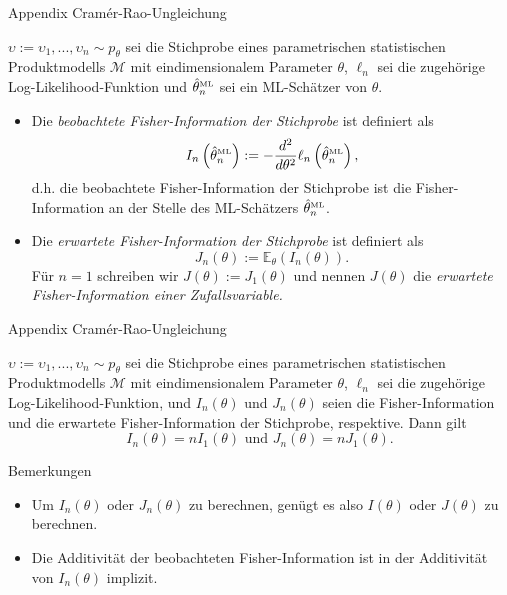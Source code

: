 \documentclass[
  8pt,
  ignorenonframetext,
]{beamer}
\providecommand{\tightlist}{%
  \setlength{\itemsep}{0pt}\setlength{\parskip}{0pt}}
\newcommand{\ups} {\upsilon}
\begin{document}
\begin{frame}{Appendix \textbar{} Cramér-Rao-Ungleichung}
\protect\hypertarget{appendix-cramuxe9r-rao-ungleichung-2}{}
\small
\begin{definition}
\justifying
$\ups := \ups_1,...,\ups_n \sim p_\theta$ sei die Stichprobe eines parametrischen statistischen
Produktmodells $\mathcal{M}$ mit eindimensionalem Parameter $\theta$, $\ell_n$
sei die zugehörige Log-Likelihood-Funktion und $\hat{\theta}_n^{\mbox{\tiny ML}}$
sei ein ML-Schätzer von $\theta$.
\begin{itemize}
\justifying
\item Die \textit{beobachtete Fisher-Information der Stichprobe} ist
definiert als
\begin{equation}
I_n\left(\hat{\theta}^{\mbox{\tiny ML}}_n\right)
:= -\frac{d^2}{d\theta^2}\ell_n\left(\hat{\theta}^{\mbox{\tiny ML}}_n\right),
\end{equation}
d.h. die beobachtete Fisher-Information der Stichprobe ist die
Fisher-Information an der Stelle des ML-Schätzers $\hat{\theta}^{\mbox{\tiny ML}}_n$.
\item Die \textit{erwartete Fisher-Information der Stichprobe} ist
definiert als
\begin{equation}
J_n(\theta) := \mathbb{E}_\theta(I_n(\theta)).
\end{equation}
Für $n = 1$ schreiben wir $J(\theta) := J_1(\theta)$ und nennen $J(\theta)$ die
\textit{erwartete Fisher-Information einer Zufallsvariable.}
\end{itemize}
\end{definition}
\end{frame}

\begin{frame}{Appendix \textbar{} Cramér-Rao-Ungleichung}
\protect\hypertarget{appendix-cramuxe9r-rao-ungleichung-3}{}
\small
\begin{theorem}
\normalfont
\justifying
$\ups := \ups_1,...,\ups_n \sim p_\theta$ sei die Stichprobe eines parametrischen statistischen
Produktmodells $\mathcal{M}$ mit eindimensionalem Parameter $\theta$, $\ell_n$ sei
die zugehörige Log-Likelihood-Funktion, und $I_n(\theta)$ und $J_n(\theta)$ seien
die Fisher-Information und die erwartete Fisher-Information der Stichprobe, respektive.
Dann gilt
\begin{equation}
I_n(\theta) = nI_1(\theta) \mbox{ und } J_n(\theta) = nJ_1(\theta).
\end{equation}
\end{theorem}

\footnotesize

Bemerkungen

\begin{itemize}
\tightlist
\item
  Um \(I_n(\theta)\) oder \(J_n(\theta)\) zu berechnen, genügt es also
  \(I(\theta)\) oder \(J(\theta)\) zu berechnen.
\item
  Die Additivität der beobachteten Fisher-Information ist in der
  Additivität von \(I_n(\theta)\) implizit.
\end{itemize}
\end{frame}
\end{document}
